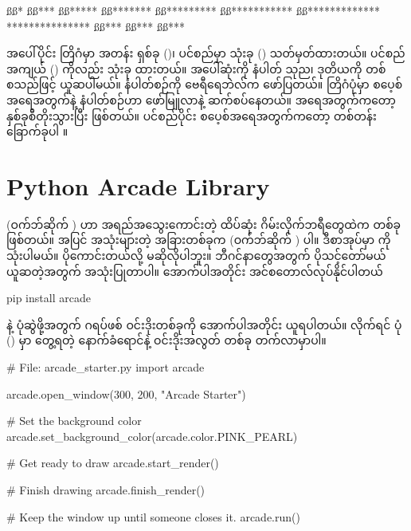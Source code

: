 \begin{codetxt}
ß\fCode{\color{lightgray}{␣␣␣␣␣␣␣}}ß*
ß\fCode{\color{lightgray}{␣␣␣␣␣␣}}ß***
ß\fCode{\color{lightgray}{␣␣␣␣␣}}ß*****
ß\fCode{\color{lightgray}{␣␣␣␣}}ß*******
ß\fCode{\color{lightgray}{␣␣␣}}ß*********
ß\fCode{\color{lightgray}{␣␣}}ß***********
ß\fCode{\color{lightgray}{␣}}ß*************
***************
ß\fCode{\color{lightgray}{␣␣␣␣␣␣}}ß***
ß\fCode{\color{lightgray}{␣␣␣␣␣␣}}ß***
ß\fCode{\color{lightgray}{␣␣␣␣␣␣}}ß***
\end{codetxt}
%

အပေါ်ပိုင်း တြိဂံမှာ အတန်း ရှစ်ခု ()၊ ပင်စည်မှာ သုံးခု () သတ်မှတ်ထားတယ်။ ပင်စည် အကျယ် () ကိုလည်း \fCode{*} သုံးခု ထားတယ်။ အပေါ်ဆုံးကို  နံပါတ် သုည၊ ဒုတိယကို တစ် စသည်ဖြင့် ယူဆပါမယ်။  နံပါတ်စဉ်ကို  ဗေရီရေဘဲလ်က ဖော်ပြတယ်။ တြိဂံပုံမှာ  စပေ့စ်အရေအတွက်နဲ့   နံပါတ်စဉ်ဟာ  ဖော်မြူလာနဲ့ ဆက်စပ်နေတယ်။ \fCode{*} အရေအတွက်ကတော့ နှစ်ခုစီတိုးသွားပြီး  ဖြစ်တယ်။ ပင်စည်ပိုင်း စပေ့စ်အရေအတွက်ကတော့ တစ်တန်း ခြောက်ခုပါ  ။


\section{Python Arcade Library} \label{sec:python_arcade}
 (ဝက်ဘ်ဆိုက် ) ဟာ အရည်အသွေးကောင်းတဲ့ ထိပ်ဆုံး  ဂိမ်းလိုက်ဘရီတွေထဲက တစ်ခုဖြစ်တယ်။  အပြင် အသုံးများတဲ့ အခြားတစ်ခုက  (ဝက်ဘ်ဆိုက် ) ပါ။ ဒီစာအုပ်မှာ  ကို သုံးပါမယ်။  ပိုကောင်းတယ်လို့ မဆိုလိုပါဘူး။ ဘီဂင်နာတွေအတွက် ပိုသင့်တော်မယ် ယူဆတဲ့အတွက် အသုံးပြုတာပါ။ အောက်ပါအတိုင်း အင်စတောလ်လုပ်နိုင်ပါတယ်
\begin{codetxt}
pip install arcade
\end{codetxt}

  နဲ့ ပုံဆွဲဖို့အတွက် ဂရပ်ဖစ် ဝင်းဒိုးတစ်ခုကို အောက်ပါအတိုင်း ယူရပါတယ်။  လိုက်ရင် ပုံ (\fRefNo{\ref{fig:ch07starter}}) မှာ တွေ့ရတဲ့ နောက်ခံရောင်နဲ့ ဝင်းဒိုးအလွတ် တစ်ခု တက်လာမှာပါ။
%
\begin{py}
# File: arcade_starter.py
import arcade

arcade.open_window(300, 200, "Arcade Starter")

# Set the background color
arcade.set_background_color(arcade.color.PINK_PEARL)

# Get ready to draw
arcade.start_render()

# Finish drawing
arcade.finish_render()

# Keep the window up until someone closes it.
arcade.run()

\end{py}
%

